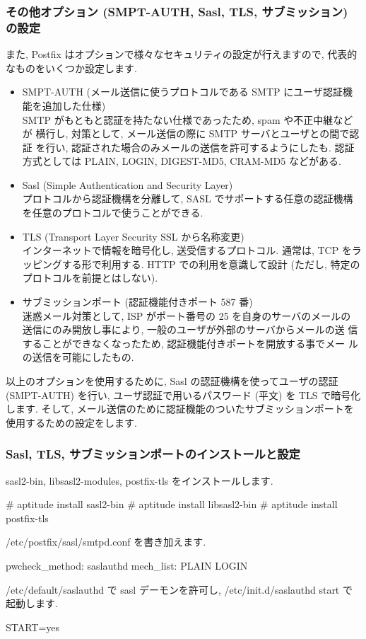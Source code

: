 \documentclass[mingoth,a4paper]{jsarticle}
\begin{document}
\subsubsection{その他オプション (SMPT-AUTH, Sasl, TLS, サブミッション) の設定}
また, Postfix はオプションで様々なセキュリティの設定が行えますので, 代表的なものをいくつか設定します.
\begin{itemize}
\item SMPT-AUTH (メール送信に使うプロトコルである SMTP にユーザ認証機能を追加した仕様)\\
      SMTP がもともと認証を持たない仕様であったため, spam や不正中継などが
      横行し, 対策として, メール送信の際に SMTP サーバとユーザとの間で認証
      を行い, 認証された場合のみメールの送信を許可するようにしたも. 認証
      方式としては PLAIN, LOGIN, DIGEST-MD5, CRAM-MD5 などがある.
\item Sasl (Simple Authentication and Security Layer) \\
      プロトコルから認証機構を分離して, SASL でサポートする任意の認証機構
      を任意のプロトコルで使うことができる.
\item TLS (Transport Layer Security  SSL から名称変更) \\
      インターネットで情報を暗号化し, 送受信するプロトコル. 通常は, TCP
      をラッピングする形で利用する. HTTP での利用を意識して設計 (ただし,
      特定のプロトコルを前提とはしない).
\item サブミッションポート (認証機能付きポート  587 番) \\
      迷惑メール対策として, ISP がポート番号の 25 を自身のサーバのメールの
      送信にのみ開放し事により, 一般のユーザが外部のサーバからメールの送
      信することができなくなったため, 認証機能付きポートを開放する事でメー
      ルの送信を可能にしたもの.
\end{itemize}

以上のオプションを使用するために, Sasl の認証機構を使ってユーザの認証 (SMPT-AUTH) を行い, ユーザ認証で用いるパスワード (平文) を TLS で暗号化します. そして, メール送信のために認証機能のついたサブミッションポートを使用するための設定をします.

\subsubsection{Sasl, TLS, サブミッションポートのインストールと設定}
sasl2-bin, libsasl2-modules, postfix-tls をインストールします.
\begin{commandline}
# aptitude install sasl2-bin
# aptitude install libsasl2-bin
# aptitude install postfix-tls
\end{commandline}
/etc/postfix/sasl/smtpd.conf を書き加えます.
\begin{commandline}
pwcheck_method: saslauthd
mech_list: PLAIN LOGIN
\end{commandline}
/etc/default/saslauthd で sasl デーモンを許可し, /etc/init.d/saslauthd start で起動します.
\begin{commandline}
START=yes
\end{commandline}
\end{document}
